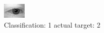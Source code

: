 \begin{figure}[h!]
\begin{center}
\includegraphics[width=0.60\columnwidth]{figures/ID343_class_1_target_2.png}
\end{center}
\caption{ Classification: 1 actual target: 2}
\label{fig:ID343_class_1_target_2}
\end{figure}
